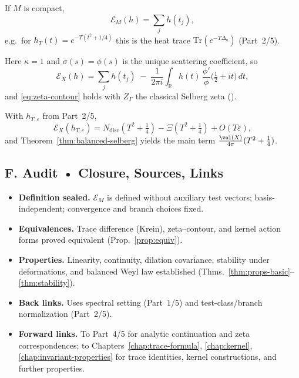 \begin{example}
If $M$ is compact,
\[
  \mathcal E_M(h)=\sum_{j} h(t_j),
\]
e.g.\ for $h_T(t)=e^{-T(t^2+1/4)}$ this is the heat trace $\mathrm{Tr}(e^{-T\Delta_g})$ (Part~2/5).
\end{example}

\begin{example}[Modular surface $X=\mathrm{PSL}_2(\mathbb Z)\backslash\mathbb H$]
Here $\kappa=1$ and $\sigma(s)=\phi(s)$ is the unique scattering coefficient, so
\[
  \mathcal E_X(h)=\sum_j h(t_j) \;-\; \frac{1}{2\pi i}\int_{\mathbb R} h(t)\,\frac{\phi'}{\phi}\!\Big(\tfrac12+it\Big)\,dt,
\]
and \eqref{eq:zeta-contour} holds with $Z_\Gamma$ the classical Selberg zeta (\cite{Hejhal1983}).
\end{example}

\begin{example}
With $h_{T,\varepsilon}$ from Part~2/5,
\[
  \mathcal E_X(h_{T,\varepsilon})=N_{\mathrm{disc}}(T^2+\tfrac14) - \Xi(T^2+\tfrac14) + O(T\varepsilon),
\]
and Theorem~\ref{thm:balanced-selberg} yields the main term $\frac{\vol(X)}{4\pi}(T^2+\frac14)$.
\end{example}


\subsection*{F. Audit • Closure, Sources, Links}
\label{subsec:audit-ef}

\begin{tcolorbox}[colback=gray!3,colframe=gray!50,title=ZNB-9+++ Audit Outcome (sealed)]
\begin{itemize}
  \item \textbf{Definition sealed.} $\mathcal E_M$ is defined without auxiliary test vectors; basis-independent; convergence and branch choices fixed.
  \item \textbf{Equivalences.} Trace difference (Krein), zeta–contour, and kernel action forms proved equivalent (Prop.~\ref{prop:equiv}).
  \item \textbf{Properties.} Linearity, continuity, dilation covariance, stability under deformations, and balanced Weyl law established (Thms.~\ref{thm:props-basic}–\ref{thm:stability}).
  \item \textbf{Back links.} Uses spectral setting (Part~1/5) and test-class/branch normalization (Part~2/5).
  \item \textbf{Forward links.} To Part~4/5 for analytic continuation and zeta correspondences; to Chapters~\ref{chap:trace-formula}, \ref{chap:kernel}, \ref{chap:invariant-properties} for trace identities, kernel constructions, and further properties.
\end{itemize}
\end{tcolorbox}

